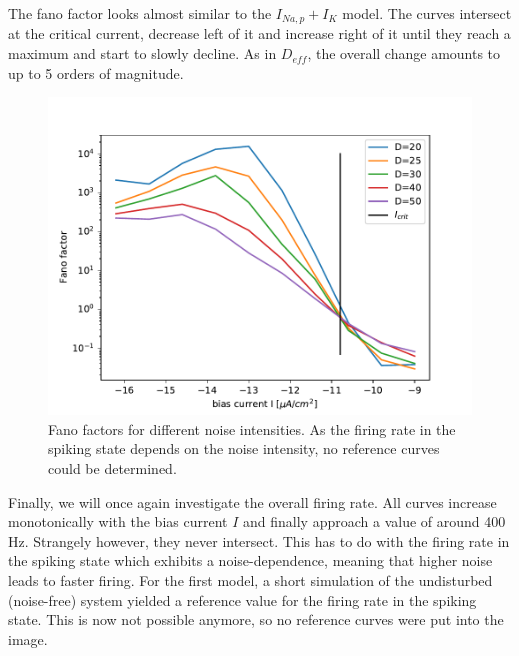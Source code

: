 \documentclass[12pt,a4paper]{article}
\begin{document}
The fano factor looks almost similar to the $I_{Na,p}+I_K$ model. The curves intersect at the critical current, decrease left of it and increase right of it until they reach a maximum and start to slowly decline. As in $D_{eff}$, the overall change amounts to up to 5 orders of magnitude.
\begin{figure}[H]
	\centering
	\includegraphics[scale=1]{fneursinglecritrealrinzelrangelong26d1realrinzelrange26d1.pdf}\caption{Fano factors for different noise intensities. As the firing rate in the spiking state depends on the noise intensity, no reference curves could be determined.}
	\label{fanorinzel}
\end{figure}
Finally, we will once again investigate the overall firing rate. All curves increase monotonically with the bias current $I$ and finally approach a value of around 400 Hz. Strangely however, they never intersect. This has to do with the firing rate in the spiking state which exhibits a noise-dependence, meaning that higher noise leads to faster firing. For the first model, a short simulation of the undisturbed (noise-free) system yielded a reference value for the firing rate in the spiking state. This is now not possible anymore, so no reference curves were put into the image.
\end{document}
